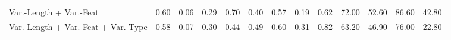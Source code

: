 \begin{tabular}{lrrrrrrrrrrrr}
Var.-Length + Var.-Feat              &                        0.60 &                            0.06 &                       0.29 &                            0.70 &                              0.40 &                                  0.57 &                             0.19 &                                  0.62 &                                       72.00 &                                           52.60 &                                      86.60 &                                           42.80 \\
Var.-Length + Var.-Feat + Var.-Type  &                        0.58 &                            0.07 &                       0.30 &                            0.44 &                              0.49 &                                  0.60 &                             0.31 &                                  0.82 &                                       63.20 &                                           46.90 &                                      76.00 &                                           22.80 \\
\bottomrule
\end{tabular}
